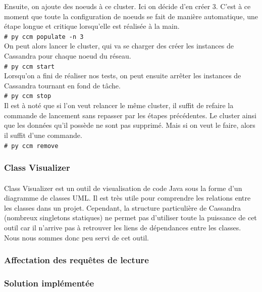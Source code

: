 \documentclass[12pt]{article}
\newcommand{\shellcmd}[1]{\\\indent\indent\texttt{\footnotesize\# #1}\\}
\begin{document}
Ensuite, on ajoute des noeuds à ce cluster. Ici on décide d'en créer 3. C'est à ce moment que toute la configuration de noeuds se fait de manière automatique, une étape longue et critique lorsqu'elle est réalisée à la main.
\shellcmd{py ccm populate -n 3}

On peut alors lancer le cluster, qui va se charger des créer les instances de Cassandra pour chaque noeud du réseau.
\shellcmd{py ccm start}

Lorsqu'on a fini de réaliser nos tests, on peut ensuite arrêter les instances de Cassandra tournant en fond de tâche.
\shellcmd{py ccm stop}

Il est à noté que si l'on veut relancer le même cluster, il suffit de refaire la commande de lancement sans repasser par les étapes précédentes. Le cluster ainsi que les données qu'il possède ne sont pas supprimé. Mais si on veut le faire, alors il suffit d'une commande.
\shellcmd{py ccm remove}

\subsubsection*{Class Visualizer}

\paragraph{}Class Visualizer est un outil de visualisation de code Java sous la forme d'un diagramme de classes UML. Il est très utile pour comprendre les relations entre les classes dans un projet. Cependant, la structure particulière de Cassandra (nombreux singletons statiques) ne permet pas d'utiliser toute la puissance de cet outil car il n'arrive pas à retrouver les liens de dépendances entre les classes. Nous nous sommes donc peu servi de cet outil.

\subsubsection{Affectation des requêtes de lecture}

\subsubsection*{Solution implémentée}
\end{document}
